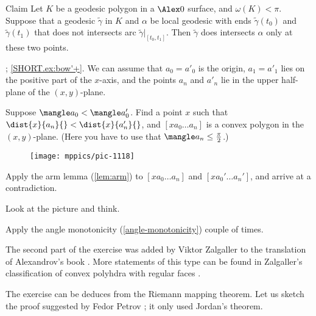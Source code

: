 \begin{thm}{Claim}
Let $K$ be a geodesic polygon in a $\Alex0$ surface, and $\omega(K)<\pi$.
Suppose that a geodesic $\tilde\gamma$ in $K$ and $\alpha$ be local geodesic with ends $\tilde\gamma(t_0)$ and $\tilde\gamma(t_1)$ that does not intersects arc $\tilde\gamma|_{[t_0,t_1]}$.
Then $\tilde\gamma$ does intersects $\alpha$ only at these two points.
\end{thm}




















\parbf{\ref{ex:arm'}};
\ref{SHORT.ex:bow'+}.
We can assume that $a_0=a'_0$ is the origin, $a_1=a'_1$ lies on the positive part of the $x$-axis,
and the points $a_n$ and $a'_n$ lie in the upper half-plane of the $(x,y)$-plane.

Suppose $\mangle a_0<\mangle a_0'$.
Find a point $x$ such that
$\dist{x}{a_n}{}<\dist{x}{a_n'}{}$, and $[x a_0\dots a_n]$ is a convex polygon in the $(x,y)$-plane.
(Here you have to use that $\mangle a_n\le\tfrac\pi2$.)

{

\begin{wrapfigure}{r}{47 mm}
\vskip-7mm
\centering
\texttt{[image: mppics/pic-1118]}
\vskip0mm
\end{wrapfigure}

Apply the arm lemma (\ref{lem:arm}) to $[x a_0\dots a_n]$ and $[x a_0'\dots a_n']$, and arrive at a contradiction.

 Look at the picture and think.

}

Apply the angle monotonicity (\ref{angle-monotonicity}) couple of times.


 The second part of the exercise was added by Viktor Zalgaller to the translation of Alexandrov's book \cite{alexandrov}.
More statements of this type can be found in Zalgaller's classification of convex polyhdra with regular faces \cite{zalgaller}.


The exercise can be deduces from the Riemann mapping theorem.
Let us sketch the proof suggested by Fedor Petrov \cite{petrov};
it only used Jordan's theorem.

